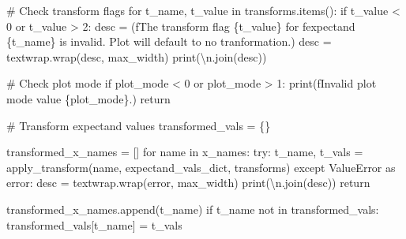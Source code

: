 \documentclass[
  letterpaper,
  DIV=11,
  numbers=noendperiod]{scrartcl}
\newenvironment{Shaded}{\begin{snugshade}}{\end{snugshade}}
\newcommand{\BuiltInTok}[1]{\textcolor[rgb]{0.00,0.23,0.31}{#1}}
\newcommand{\CharTok}[1]{\textcolor[rgb]{0.13,0.47,0.30}{#1}}
\newcommand{\CommentTok}[1]{\textcolor[rgb]{0.37,0.37,0.37}{#1}}
\newcommand{\ControlFlowTok}[1]{\textcolor[rgb]{0.00,0.23,0.31}{#1}}
\newcommand{\DecValTok}[1]{\textcolor[rgb]{0.68,0.00,0.00}{#1}}
\newcommand{\ImportTok}[1]{\textcolor[rgb]{0.00,0.46,0.62}{#1}}
\newcommand{\KeywordTok}[1]{\textcolor[rgb]{0.00,0.23,0.31}{#1}}
\newcommand{\NormalTok}[1]{\textcolor[rgb]{0.00,0.23,0.31}{#1}}
\newcommand{\OperatorTok}[1]{\textcolor[rgb]{0.37,0.37,0.37}{#1}}
\newcommand{\PreprocessorTok}[1]{\textcolor[rgb]{0.68,0.00,0.00}{#1}}
\newcommand{\SpecialCharTok}[1]{\textcolor[rgb]{0.37,0.37,0.37}{#1}}
\newcommand{\SpecialStringTok}[1]{\textcolor[rgb]{0.13,0.47,0.30}{#1}}
\newcommand{\StringTok}[1]{\textcolor[rgb]{0.13,0.47,0.30}{#1}}
\begin{document}
\begin{Shaded}
\begin{Highlighting}[]
  \CommentTok{\# Check transform flags}
  \ControlFlowTok{for}\NormalTok{ t\_name, t\_value }\KeywordTok{in}\NormalTok{ transforms.items():}
    \ControlFlowTok{if}\NormalTok{ t\_value }\OperatorTok{\textless{}} \DecValTok{0} \KeywordTok{or}\NormalTok{ t\_value }\OperatorTok{\textgreater{}} \DecValTok{2}\NormalTok{:}
\NormalTok{      desc }\OperatorTok{=}\NormalTok{ (}\SpecialStringTok{f\textquotesingle{}The transform flag }\SpecialCharTok{\{}\NormalTok{t\_value}\SpecialCharTok{\}}\SpecialStringTok{ for \textquotesingle{}}
              \SpecialStringTok{f\textquotesingle{}expectand }\SpecialCharTok{\{}\NormalTok{t\_name}\SpecialCharTok{\}}\SpecialStringTok{ is invalid.  \textquotesingle{}}
              \StringTok{\textquotesingle{}Plot will default to no tranformation.\textquotesingle{}}\NormalTok{)}
\NormalTok{      desc }\OperatorTok{=}\NormalTok{ textwrap.wrap(desc, max\_width)}
      \BuiltInTok{print}\NormalTok{(}\StringTok{\textquotesingle{}}\CharTok{\textbackslash{}n}\StringTok{\textquotesingle{}}\NormalTok{.join(desc))}

  \CommentTok{\# Check plot mode}
  \ControlFlowTok{if}\NormalTok{ plot\_mode }\OperatorTok{\textless{}} \DecValTok{0} \KeywordTok{or}\NormalTok{ plot\_mode }\OperatorTok{\textgreater{}} \DecValTok{1}\NormalTok{:}
    \BuiltInTok{print}\NormalTok{(}\SpecialStringTok{f\textquotesingle{}Invalid \textasciigrave{}plot mode\textasciigrave{} value }\SpecialCharTok{\{}\NormalTok{plot\_mode}\SpecialCharTok{\}}\SpecialStringTok{.\textquotesingle{}}\NormalTok{)}
    \ControlFlowTok{return}
    
  \CommentTok{\# Transform expectand values}
\NormalTok{  transformed\_vals }\OperatorTok{=}\NormalTok{ \{\}}
  
\NormalTok{  transformed\_x\_names }\OperatorTok{=}\NormalTok{ []}
  \ControlFlowTok{for}\NormalTok{ name }\KeywordTok{in}\NormalTok{ x\_names:}
    \ControlFlowTok{try}\NormalTok{: }
\NormalTok{      t\_name, t\_vals }\OperatorTok{=}\NormalTok{ apply\_transform(name,}
\NormalTok{                                       expectand\_vals\_dict,}
\NormalTok{                                       transforms)}
    \ControlFlowTok{except} \PreprocessorTok{ValueError} \ImportTok{as}\NormalTok{ error:}
\NormalTok{      desc }\OperatorTok{=}\NormalTok{ textwrap.wrap(error, max\_width)}
      \BuiltInTok{print}\NormalTok{(}\StringTok{\textquotesingle{}}\CharTok{\textbackslash{}n}\StringTok{\textquotesingle{}}\NormalTok{.join(desc))}
      \ControlFlowTok{return}
    
\NormalTok{    transformed\_x\_names.append(t\_name)}
    \ControlFlowTok{if}\NormalTok{ t\_name }\KeywordTok{not} \KeywordTok{in}\NormalTok{ transformed\_vals:}
\NormalTok{      transformed\_vals[t\_name] }\OperatorTok{=}\NormalTok{ t\_vals}
      

\end{Highlighting}
\end{Shaded}
\end{document}
